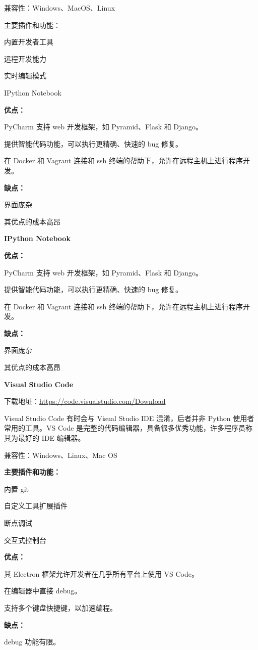 \documentclass[]{ctexbook}
\begin{document}
兼容性：Windows、MacOS、Linux

主要插件和功能：

内置开发者工具

远程开发能力

实时编辑模式

IPython Notebook

\textbf{优点：}

PyCharm 支持 web 开发框架，如 Pyramid、Flask 和 Django。

提供智能代码功能，可以执行更精确、快速的 bug 修复。

在 Docker 和 Vagrant 连接和 ssh 终端的帮助下，允许在远程主机上进行程序开发。

\textbf{缺点：}

界面庞杂

其优点的成本高昂

\textbf{IPython Notebook}

\textbf{优点：}

PyCharm 支持 web 开发框架，如 Pyramid、Flask 和 Django。

提供智能代码功能，可以执行更精确、快速的 bug 修复。

在 Docker 和 Vagrant 连接和 ssh 终端的帮助下，允许在远程主机上进行程序开发。

\textbf{缺点：}

界面庞杂

其优点的成本高昂

\textbf{Visual Studio Code}

下载地址：\url{https://code.visualstudio.com/Download}

Visual Studio Code 有时会与 Visual Studio IDE 混淆，后者并非 Python 使用者常用的工具。VS Code 是完整的代码编辑器，具备很多优秀功能，许多程序员称其为最好的 IDE 编辑器。

兼容性：Windows、Linux、Mac OS

\textbf{主要插件和功能：}

内置 git

自定义工具扩展插件

断点调试

交互式控制台

\textbf{优点：}

其 Electron 框架允许开发者在几乎所有平台上使用 VS Code。

在编辑器中直接 debug。

支持多个键盘快捷键，以加速编程。

\textbf{缺点：}

debug 功能有限。
\end{document}
